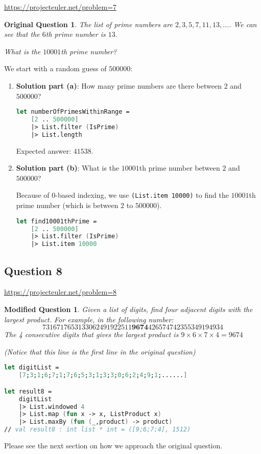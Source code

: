 \documentclass[12pt]{article}
\newtheorem*{modQuestion*}{Modified Question}
\newtheorem*{origQuestion*}{Original Question}
\begin{document}
\url{https://projecteuler.net/problem=7}

\begin{origQuestion*}
The list of prime numbers are $2, 3, 5, 7, 11, 13, \ldots$. We can see that the $6$th prime number is $13$. 

What is the $10001$th prime number?
\end{origQuestion*}

We start with a random guess of $500000$:
\begin{enumerate}
\item \textbf{Solution part (a)}: How many prime numbers are there between $2$ and $500000$?
\begin{lstlisting}[language=FSharp]
let numberOfPrimesWithinRange =
    [2 .. 500000]
    |> List.filter (IsPrime)
    |> List.length
\end{lstlisting}
Expected answer: $41538$. 

\item \textbf{Solution part (b)}: What is the $10001$th prime number between $2$ and $500000$?

Because of $0$-based indexing, we use \texttt{(List.item 10000)} to find the $10001$th prime number (which is between $2$ to $500000$).
\begin{lstlisting}[language=FSharp]
let find10001thPrime =
    [2 .. 500000]
    |> List.filter (IsPrime)
    |> List.item 10000
\end{lstlisting}

\end{enumerate}
\subsection*{Question 8} 
\url{https://projecteuler.net/problem=8}

\begin{modQuestion*}
Given a list of digits, find four adjacent digits with the largest product. For example, in the following number:
\[
7316717653133062491922511\mathbf{9674}426574742355349194934
\]
The 4 consecutive digits that gives the largest product is $9 \times 6 \times 7 \times 4 = 9674$

(Notice that this line is the first line in the original question)
\end{modQuestion*}
\begin{lstlisting}[language=FSharp]
let digitList = 
    [7;3;1;6;7;1;7;6;5;3;1;3;3;0;6;2;4;9;1;......]

let result8 =
    digitList
    |> List.windowed 4
    |> List.map (fun x -> x, ListProduct x)
    |> List.maxBy (fun (_,product) -> product)
// val result8 : int list * int = ([9;6;7;4], 1512)
\end{lstlisting}
Please see the next section on how we approach the original question.
\pagebreak
\end{document}
